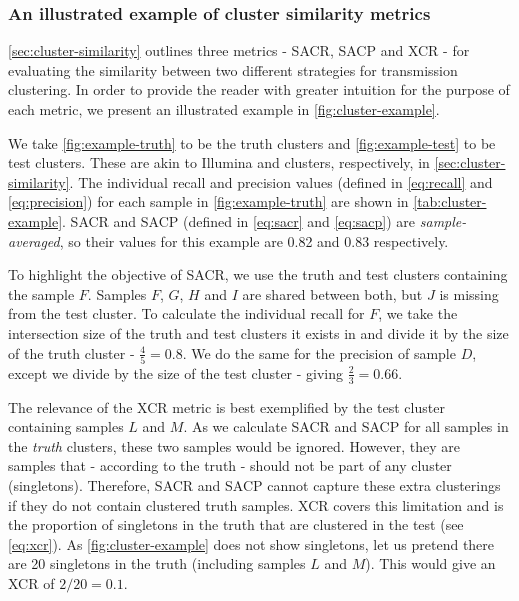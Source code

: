
\subsubsection{An illustrated example of cluster similarity metrics}
\label{sec:cluster-example}

\autoref{sec:cluster-similarity} outlines three metrics - SACR, SACP and XCR - for evaluating the similarity between two different strategies for transmission clustering. In order to provide the reader with greater intuition for the purpose of each metric, we present an illustrated example in \autoref{fig:cluster-example}. 

We take \autoref{fig:example-truth} to be the truth clusters and \autoref{fig:example-test} to be test clusters. These are akin to Illumina and \ont{} clusters, respectively, in \autoref{sec:cluster-similarity}. The individual recall and precision values (defined in \autoref{eq:recall} and \autoref{eq:precision}) for each sample in \autoref{fig:example-truth} are shown in \autoref{tab:cluster-example}. SACR and SACP (defined in \autoref{eq:sacr} and \autoref{eq:sacp}) are \emph{sample-averaged}, so their values for this example are 0.82 and 0.83 respectively. 

To highlight the objective of SACR, we use the truth and test clusters containing the sample $F$. Samples $F$, $G$, $H$ and $I$ are shared between both, but $J$ is missing from the test cluster. To calculate the individual recall for $F$, we take the intersection size of the truth and test clusters it exists in and divide it by the size of the truth cluster - $\frac{4}{5}=0.8$. We do the same for the precision of sample $D$, except we divide by the size of the test cluster - giving $\frac{2}{3}=0.66$. 

The relevance of the XCR metric is best exemplified by the test cluster containing samples $L$ and $M$. As we calculate SACR and SACP for all samples in the \emph{truth} clusters, these two samples would be ignored. However, they are samples that - according to the truth - should not be part of any cluster (singletons). Therefore, SACR and SACP cannot capture these extra clusterings if they do not contain clustered truth samples. XCR covers this limitation and is the proportion of singletons in the truth that are clustered in the test (see \autoref{eq:xcr}). As \autoref{fig:cluster-example} does not show singletons, let us pretend there are 20 singletons in the truth (including samples $L$ and $M$). This would give an XCR of $2/20=0.1$.

